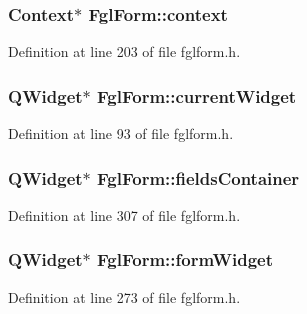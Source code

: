 \hypertarget{classFglForm_ad88a7b19b295fe1f14de652a9e3e1c17}{
\subsubsection[{context}]{\setlength{\rightskip}{0pt plus 5cm}Context$\ast$ {\bf FglForm::context}}}
\label{classFglForm_ad88a7b19b295fe1f14de652a9e3e1c17}


Definition at line 203 of file fglform.h.

\hypertarget{classFglForm_abce220040f982717756bfc10b51dac44}{
\subsubsection[{currentWidget}]{\setlength{\rightskip}{0pt plus 5cm}QWidget$\ast$ {\bf FglForm::currentWidget}}}
\label{classFglForm_abce220040f982717756bfc10b51dac44}


Definition at line 93 of file fglform.h.

\hypertarget{classFglForm_a67c8174c2d61e69e76c3206766fe3ac9}{
\subsubsection[{fieldsContainer}]{\setlength{\rightskip}{0pt plus 5cm}QWidget$\ast$ {\bf FglForm::fieldsContainer}}}
\label{classFglForm_a67c8174c2d61e69e76c3206766fe3ac9}


Definition at line 307 of file fglform.h.

\hypertarget{classFglForm_a382565fe4e148f5e37aabea41e079809}{
\subsubsection[{formWidget}]{\setlength{\rightskip}{0pt plus 5cm}QWidget$\ast$ {\bf FglForm::formWidget}}}
\label{classFglForm_a382565fe4e148f5e37aabea41e079809}


Definition at line 273 of file fglform.h.

